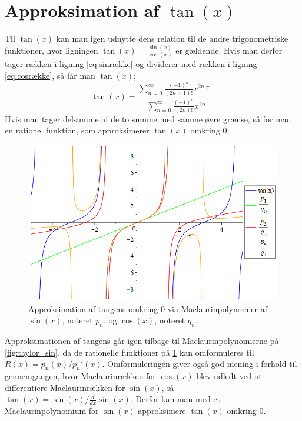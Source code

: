 \section{Approksimation af $\tan(x)$}
Til $\tan(x)$ kan man igen udnytte dens relation til de andre trigonometriske funktioner, hvor ligningen $\tan(x)=\frac{\sin(x)}{\cos(x)}$ er gældende. Hvis man derfor tager rækken i ligning \ref{eq:sinrække} og dividerer med rækken i ligning \ref{eq:cosrække}, så får man $\tan(x)$;
\begin{equation}\label{eq:tanbrøk}
\tan(x)
=
\frac{\sum_{n=0}^{\infty} \frac{(-1)^n}{(2n+1)!}x^{2n+1}}
{\sum_{n=0}^{\infty} \frac{(-1)^n}{(2n)!}x^{2n}}
\end{equation}
Hvis man tager delsumme af de to summe med samme øvre grænse, så for man en rationel funktion, som approksimerer $\tan(x)$ omkring $0$;
\begin{figure}[H]
	\centering
	\includegraphics[scale=0.4]{fig/img/approks_tan}
	\caption{Approksimation af tangens omkring 0 via Maclaurinpolynomier af $\sin(x)$, noteret $p_n$, og $\cos(x)$, noteret $q_n$.}
 	\label{fig:approks_tan}
\end{figure}
Approksimationen af tangens går igen tilbage til Maclaurinpolynomierne på \ref{fig:taylor_sin}, da de rationelle funktioner på \ref{fig:approks_tan} kan omformuleres til $R(x)=p_n(x)/p_n'(x)$. Omformuleringen giver også god mening i forhold til gennemgangen, hvor Maclaurinrækken for $\cos(x)$ blev udledt ved at differentiere Maclaurinrækken for $\sin(x)$, så $\tan(x)=\sin(x)/\frac{d}{dx}\sin(x)$. Derfor kan man med et Maclaurinpolynomium for $\sin(x)$ approksimere $\tan(x)$ omkring $0$.
